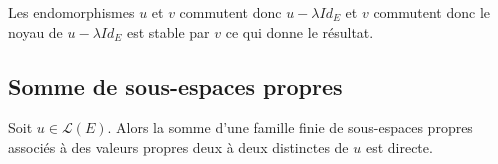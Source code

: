 \documentclass[a4paper,10pt]{report}
\begin{document}
\begin{preuve} Les endomorphismes $u$ et $v$ commutent donc $u- \lambda Id_E$ et $v$ commutent donc le noyau de $u- \lambda Id_E$ est stable par $v$ ce qui donne le résultat.
\end{preuve}

\subsection{Somme de sous-espaces propres}

\begin{prop} Soit $u \in \mathcal{L}(E)$. Alors la somme d'une famille finie de sous-espaces propres associés à des valeurs propres deux à deux distinctes de $u$ est directe.
\end{prop}

\begin{preuve} 
%
%


\end{preuve}
\end{document}
